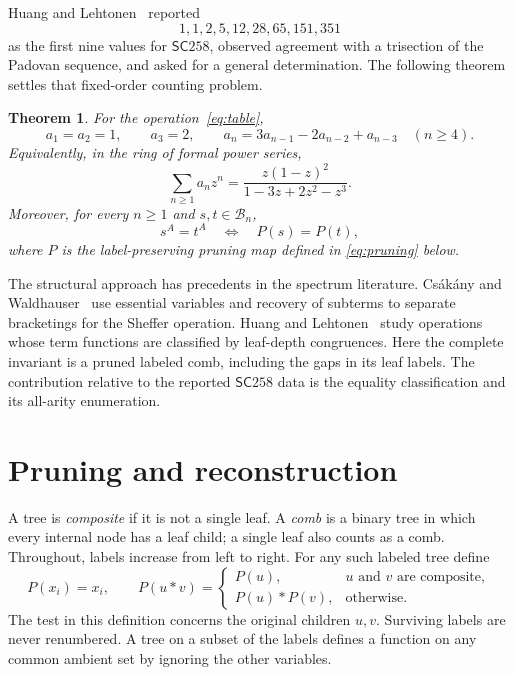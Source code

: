 \documentclass[11pt]{amsart}
\newtheorem{theorem}{Theorem}
\newcommand{\B}{\mathcal{B}}
\newcommand{\SC}{\mathsf{SC}258}
\begin{document}
Huang and Lehtonen~\cite[Section~7]{HuangLehtonen2024} reported
\[
 1,1,2,5,12,28,65,151,351
\]
as the first nine values for \(\SC\), observed agreement with a trisection
of the Padovan sequence, and asked for a general determination. The following
theorem settles that fixed-order counting problem.

\newpage
\begin{theorem}\label{thm:main}
For the operation~\eqref{eq:table},
\begin{equation}\label{eq:recurrence}
 a_1=a_2=1,\qquad a_3=2,\qquad
 a_n=3a_{n-1}-2a_{n-2}+a_{n-3}\quad(n\geq4).
\end{equation}
Equivalently, in the ring of formal power series,
\begin{equation}\label{eq:gf}
 \sum_{n\geq1}a_nz^n=\frac{z(1-z)^2}{1-3z+2z^2-z^3}.
\end{equation}
Moreover, for every \(n\geq1\) and \(s,t\in\B_n\),
\begin{equation}\label{eq:classification}
 s^A=t^A\quad\Longleftrightarrow\quad P(s)=P(t),
\end{equation}
where \(P\) is the label-preserving pruning map defined in
\eqref{eq:pruning} below.
\end{theorem}

The structural approach has precedents in the spectrum literature.
Cs\'ak\'any and Waldhauser~\cite[Section~4.2]{CsakanyWaldhauser2000}
use essential variables and recovery of subterms to separate bracketings
for the Sheffer operation. Huang and
Lehtonen~\cite[Section~7]{HuangLehtonen2023} study operations whose term
functions are classified by leaf-depth congruences. Here the complete
invariant is a pruned labeled comb, including the gaps in its leaf labels.
The contribution relative to the reported \(\SC\) data is the equality
classification and its all-arity enumeration.

\section{Pruning and reconstruction}

A tree is \emph{composite} if it is not a single leaf. A \emph{comb} is a
binary tree in which every internal node has a leaf child; a single leaf
also counts as a comb. Throughout, labels increase from left to right.
For any such labeled tree define
\begin{equation}\label{eq:pruning}
 P(x_i)=x_i,\qquad
 P(u*v)=
 \begin{cases}
  P(u),&u\text{ and }v\text{ are composite},\\
  P(u)*P(v),&\text{otherwise}.
 \end{cases}
\end{equation}
The test in this definition concerns the original children \(u,v\).
Surviving labels are never renumbered. A tree on a subset of the labels
defines a function on any common ambient set by ignoring the other variables.
\end{document}
